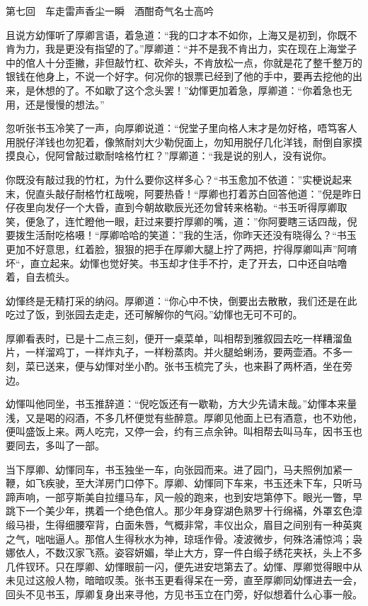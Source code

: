 \documentclass[12pt,UTF8]{ctexbook}
\begin{document}
{{{第七回　车走雷声香尘一瞬　酒酣奇气名士高吟





且说方幼惲听了厚卿言语，着急道：“我的口才本不如你，上海又是初到，你既不肯为力，我是更没有指望的了。”厚卿道：“并不是我不肯出力，实在现在上海堂子中的倌人十分歪撇，非但敲竹杠、砍斧头，不肯放松一点，你就是花了整千整万的银钱在他身上，不说一个好字。何况你的银票已经到了他的手中，要再去挖他的出来，是休想的了。不如歇了这个念头罢！”幼惲更加着急，厚卿道：“你着急也无用，还是慢慢的想法。”

忽听张书玉冷笑了一声，向厚卿说道：“倪堂子里向格人末才是勿好格，唔笃客人用脱仔洋钱也勿犯着，像煞耐刘大少勒倪面上，勿知用脱仔几化洋钱，耐倒自家摸摸良心，倪阿曾敲过歇耐啥格竹杠？”厚卿道：“我是说的别人，没有说你。

你既没有敲过我的竹杠，为什么要你这样多心？“书玉愈加不依道：”实梗说起来末，倪直头敲仔耐格竹杠哉啘，阿要热昏！“厚卿也打着苏白回答他道：”倪是昨日仔夜里向发仔一个大昏，直到今朝故歇辰光还勿曾转来格勒。“书玉听得厚卿取笑，便急了，连忙瞪他一眼，赶过来要拧厚卿的嘴，道：”你阿要瞎三话四哉，倪要拨生活耐吃格嗫！“厚卿哈哈的笑道：”我的生活，你昨天还没有晓得么？“书玉更加不好意思，红着脸，狠狠的把手在厚卿大腿上拧了两把，拧得厚卿叫声”阿唷坏“，直立起来。幼惲也觉好笑。书玉却才住手不拧，走了开去，口中还自咕噜着，自去梳头。

幼惲终是无精打采的纳闷。厚卿道：“你心中不快，倒要出去散散，我们还是在此吃过了饭，到张园去走走，还可解解你的气闷。”幼惲也无可不可的。

厚卿看表时，已是十二点三刻，便开一桌菜单，叫相帮到雅叙园去吃一样糟溜鱼片，一样溜鸡丁，一样炸丸子，一样粉蒸肉。并火腿蛤蜊汤，要两壶酒。不多一刻，菜已送来，便与幼惲对坐小酌。张书玉梳完了头，也来斟了两杯酒，坐在旁边。

幼惲叫他同坐，书玉推辞道：“倪吃饭还有一歇勒，方大少先请末哉。”幼惲本来量浅，又是喝的闷酒，不多几杯便觉有些醉意。厚卿见他面上已有酒意，也不劝他，便叫盛饭上来。两人吃完，又停一会，约有三点余钟。叫相帮去叫马车，因书玉也要同去，多叫了一部。

当下厚卿、幼惲同车，书玉独坐一车，向张园而来。进了园门，马夫照例加紧一鞭，如飞疾驶，至大洋房门口停下。厚卿、幼惲同下车来，书玉还未下车，只听马蹄声响，一部亨斯美自拉缰马车，风一般的跑来，也到安垲第停下。眼光一瞥，早跳下一个美少年，携着一个绝色倌人。那少年身穿湖色熟罗十行绵襔，外罩玄色漳缎马褂，生得细腰窄背，白面朱唇，气概非常，丰仪出众，眉目之间别有一种英爽之气，咄咄逼人。那倌人生得秋水为神，琼瑶作骨。凌波微步，何殊洛浦惊鸿；袅娜依人，不数汉家飞燕。姿容妍媚，举止大方，穿一件白缎子绣花夹袄，头上不多几件钗环。只在厚卿、幼惲眼前一闪，便先进安垲第去了。幼惲、厚卿觉得眼中从未见过这般人物，暗暗叹羡。张书玉更看得呆在一旁，直至厚卿同幼惲进去一会，回头不见书玉，厚卿复身出来寻他，方见书玉立在门旁，好似想着什么心事一般。

}}}
\end{document}
